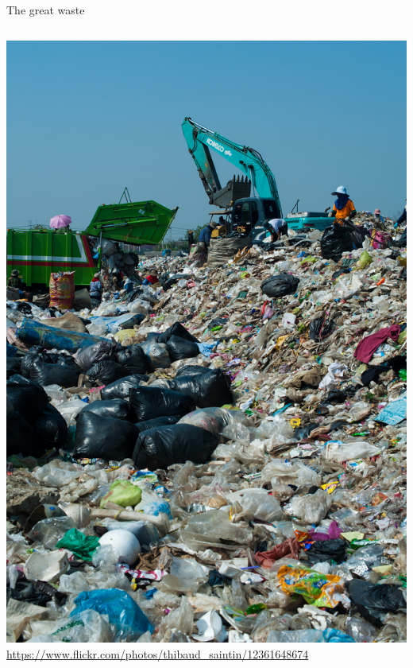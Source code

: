 \documentclass{beamer}
\begin{document}
\begin{frame}{The great waste}
\begin{columns}
\begin{column}{0.4\textwidth}
\center \includegraphics[height=0.75\textheight]{Illustrations/Trash_dump.jpg} \\
\tiny \url{https://www.flickr.com/photos/thibaud_saintin/12361648674}
\end{column}
\end{columns}
\end{frame}
\end{document}
